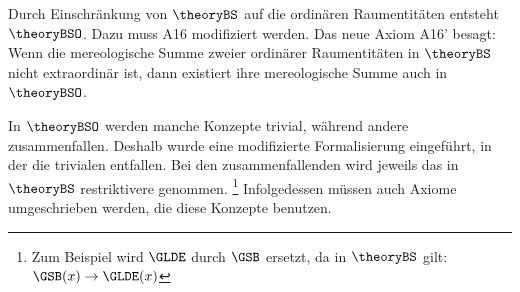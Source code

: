     Durch
    Einschränkung von $\theoryBS$ auf die ordinären Raumentitäten entsteht $\theoryBSO$.
    Dazu muss A16 modifiziert werden.
    Das neue Axiom A16' besagt: Wenn die mereologische Summe zweier ordinärer Raumentitäten in $\theoryBS$ nicht extraordinär ist, dann existiert ihre mereologische Summe auch in $\theoryBSO$.
    
    In
    $\theoryBSO$ werden manche Konzepte trivial, während andere zusammenfallen.
    Deshalb wurde eine modifizierte Formalisierung eingeführt, in der die trivialen entfallen.
    Bei den zusammenfallenden wird jeweils das in $\theoryBS$ restriktivere genommen.%
    \footnote{
        Zum Beispiel wird $\GLDE$ durch $\GSB$ ersetzt, da in $\theoryBS$ gilt: $\GSB(x) \to \GLDE(x)$
    }
    Infolgedessen müssen auch Axiome umgeschrieben werden, die diese Konzepte benutzen.
    
    
